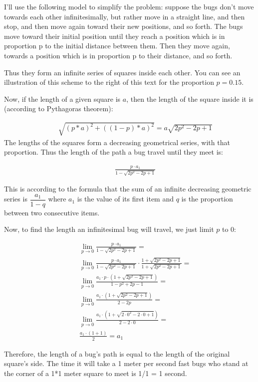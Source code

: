 \documentclass[a4paper]{article}
\begin{document}
I'll use the following model to simplify the problem: suppose the bugs don't
move towards each other infinitesimally, but rather move in a straight line, and
then stop, and then move again toward their new positions, and so forth. The
bugs move toward their initial position until they reach a position which is in
proportion p to the initial distance between them. Then they move again,
towards a position which is in proportion p to their distance, and so forth.

Thus they form an infinite series of squares inside each other. You can see an
illustration of this scheme to the right of this text for the proportion
$ p=0.15 $.

Now, if the length of a given square is $a$, then the length of the square
inside it is (according to Pythagoras theorem): 

\begin{eqnarray*}
& & \sqrt{\left(p*a\right)^2+\left(\left(1-p\right)*a\right)^2} =
a\sqrt{2p^2-2p+1}
\end{eqnarray*}
The lengths of the squares form a decreasing
geometrical series, with that proportion. Thus the length of the path a bug
travel until they meet is:

\begin{eqnarray*}
& & \frac{p \cdot a_1}{1 - \sqrt{2p^2-2p+1} }
\end{eqnarray*}

This is according to the formula that the sum of an infinite decreasing
geometric series is $\dfrac{a_1}{1-q}$ where $a_1$ is the value of its first item 
and $q$ is the proportion between two consecutive items.

Now, to find the length an infinitesimal bug will travel, we just limit $p$ to 
0: 

\begin{eqnarray*}
& & \lim\limits_{p \to 0} \frac{p \cdot a_1}{1-\sqrt{2p^2-2p+1}} = \\
& & \lim\limits_{p \to 0} \frac{p \cdot a_1}{1-\sqrt{2p^2-2p+1}} \cdot 
\frac{1+\sqrt{2p^2-2p+1}}{1+\sqrt{2p^2-2p+1}} = \\
& & \lim\limits_{p \to 0} \frac{a_1 \cdot p \cdot \left(1+\sqrt{2p^2-2p+1}\right)}{1-p^2+2p-1} = \\
& & \lim\limits_{p \to 0} \frac{a_1 \cdot \left(1+\sqrt{2p^2-2p+1}\right)}{2-2p} = \\
& & \lim\limits_{p \to 0} \frac{a_1 \cdot \left(1+\sqrt{2 \cdot 0^2-2 \cdot 0+1}\right)}{2-2 \cdot 0} = \\ 
& & \frac{a_1 \cdot (1+1)}{2} = a_1
\end{eqnarray*}

Therefore, the length of a bug's path is equal to the length of the original 
square's side. The time it will take a 1 meter per second fast bugs who stand 
at the corner of a 1*1 meter square to meet is 1/1 = 1 second.
\end{document}
